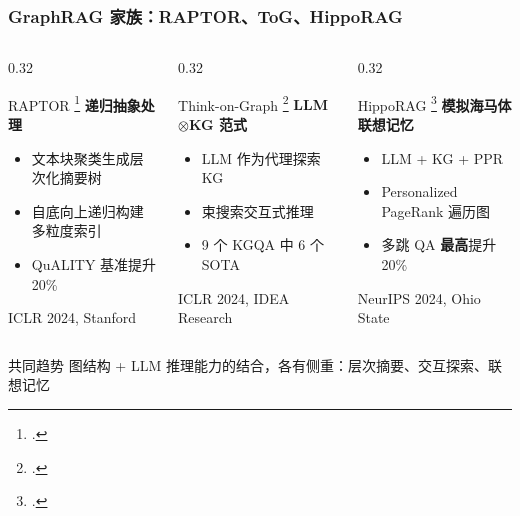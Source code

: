 \documentclass[aspectratio=169,10pt]{beamer}
\let\oldcite\cite
\renewcommand{\cite}[1]{\oldcite{#1}\footcitetext{#1}}
\begin{document}
\begin{frame}
  \frametitle{GraphRAG 家族：RAPTOR、ToG、HippoRAG}

  \begin{columns}[T]
    \begin{column}{0.32\textwidth}
      \begin{block}{RAPTOR \cite{sarthi2024raptor}}
        \small
        \textbf{递归抽象处理}
        \begin{itemize}
          \item 文本块聚类生成层次化摘要树
          \item 自底向上递归构建多粒度索引
          \item QuALITY 基准提升 20\%
        \end{itemize}
        \vspace{0.1cm}
        \tiny ICLR 2024, Stanford
      \end{block}
    \end{column}

    \begin{column}{0.32\textwidth}
      \begin{block}{Think-on-Graph \cite{sun2024tog}}
        \small
        \textbf{LLM$\otimes$KG 范式}
        \begin{itemize}
          \item LLM 作为代理探索 KG
          \item 束搜索交互式推理
          \item 9 个 KGQA 中 6 个 SOTA
        \end{itemize}
        \vspace{0.1cm}
        \tiny ICLR 2024, IDEA Research
      \end{block}
    \end{column}

    \begin{column}{0.32\textwidth}
      \begin{block}{HippoRAG \cite{gutierrez2024hipporag}}
        \small
        \textbf{模拟海马体联想记忆}
        \begin{itemize}
          \item LLM + KG + PPR
          \item Personalized PageRank 遍历图
          \item 多跳 QA \textbf{最高}提升 20\%
        \end{itemize}
        \vspace{0.1cm}
        \tiny NeurIPS 2024, Ohio State
      \end{block}
    \end{column}
  \end{columns}

  \vspace{0.4cm}

  \begin{alertblock}{共同趋势}
    图结构 + LLM 推理能力的结合，各有侧重：层次摘要、交互探索、联想记忆
  \end{alertblock}
\end{frame}
\end{document}
